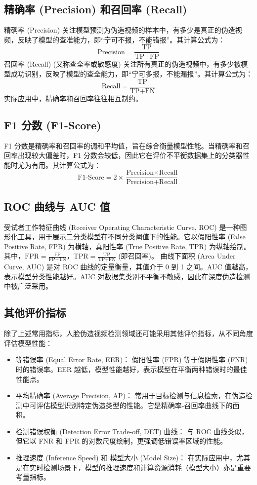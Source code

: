 \documentclass[conference]{IEEEtran}
\begin{document}
\subsection{精确率 (Precision) 和召回率 (Recall)}
精确率 (Precision) 关注模型预测为伪造视频的样本中，有多少是真正的伪造视频，反映了模型的查准能力，即“宁可不报，不能错报”。其计算公式为：
$$ \text{Precision} = \frac{\text{TP}}{\text{TP} + \text{FP}} $$
召回率 (Recall) (又称查全率或敏感度) 关注所有真正的伪造视频中，有多少被模型成功识别，反映了模型的查全能力，即“宁可多报，不能漏报”。其计算公式为：
$$ \text{Recall} = \frac{\text{TP}}{\text{TP} + \text{FN}} $$
实际应用中，精确率和召回率往往相互制约。

\subsection{F1 分数 (F1-Score)}
F1 分数是精确率和召回率的调和平均值，旨在综合衡量模型性能。当精确率和召回率出现较大偏差时，F1 分数会较低，因此它在评价不平衡数据集上的分类器性能时尤为有用。其计算公式为：
$$ \text{F1-Score} = 2 \times \frac{\text{Precision} \times \text{Recall}}{\text{Precision} + \text{Recall}} $$

\subsection{ROC 曲线与 AUC 值}
受试者工作特征曲线 (Receiver Operating Characteristic Curve, ROC) 是一种图形化工具，用于展示二分类模型在不同分类阈值下的性能。它以假阳性率 (False Positive Rate, FPR) 为横轴，真阳性率 (True Positive Rate, TPR) 为纵轴绘制。其中，$\text{FPR} = \frac{\text{FP}}{\text{FP} + \text{TN}}$，$\text{TPR} = \frac{\text{TP}}{\text{TP} + \text{FN}}$ (即召回率)。
曲线下面积 (Area Under Curve, AUC) 是对 ROC 曲线的定量衡量，其值介于 0 到 1 之间。AUC 值越高，表示模型分类性能越好。AUC 对数据集类别不平衡不敏感，因此在深度伪造检测中被广泛采用。

\subsection{其他评价指标}
除了上述常用指标，人脸伪造视频检测领域还可能采用其他评价指标，从不同角度评估模型性能：
\begin{itemize}
    \item 等错误率 (Equal Error Rate, EER)： 假阳性率 (FPR) 等于假阴性率 (FNR) 时的错误率。EER 越低，模型性能越好，表示模型在平衡两种错误时的最佳性能点。
    \item 平均精确率 (Average Precision, AP)： 常用于目标检测与信息检索，在伪造检测中可评估模型识别特定伪造类型的性能。它是精确率-召回率曲线下的面积。
    \item 检测错误权衡 (Detection Error Trade-off, DET) 曲线： 与 ROC 曲线类似，但它以 FNR 和 FPR 的对数尺度绘制，更强调低错误率区域的性能。
\item 推理速度 (Inference Speed) 和 模型大小 (Model Size)： 在实际应用中，尤其是在实时检测场景下，模型的推理速度和计算资源消耗（模型大小）亦是重要考量指标。
\end{itemize}
\end{document}
